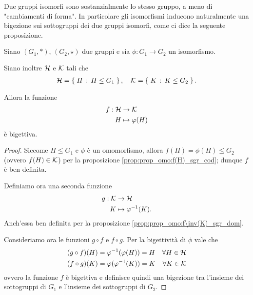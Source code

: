 Due gruppi isomorfi sono sostanzialmente lo stesso gruppo, a meno di "cambiamenti di forma". In particolare gli isomorfismi inducono naturalmente una bigezione sui sottogruppi dei due gruppi isomorfi, come ci dice la seguente proposizione.

\begin{proposition}
     \label{prop:big_sottogrp_isom}
    Siano $(G_1, *)$, $(G_2, \star)$ due gruppi e sia $\phi : G_1 \to G_2$ un isomorfismo.

    Siano inoltre $\mathcal{H}$ e $\mathcal{K}$ tali che \begin{align*}
        \mathcal{H} = \left\{\;H \,:\, H \leq G_1\;\right\}, \quad \mathcal{K} = \left\{\;K \,:\, K \leq G_2\;\right\}.
    \end{align*}

    Allora la funzione \begin{align*}
        f : \mathcal{H} &\to \mathcal{K} \\
        H &\mapsto \varphi(H)
    \end{align*} è bigettiva.
\end{proposition}
\begin{proof}
    Siccome $H \leq G_1$ e $\phi$ è un omomorfismo, allora $f(H) = \phi(H) \leq G_2$ (ovvero $f(H) \in \mathcal{K}$) per la proposizione \ref{prop:prop_omo:f(H)_sgr_cod}; dunque $f$ è ben definita.

    Definiamo ora una seconda funzione \begin{align*}
        g : \mathcal{K} &\to \mathcal{H}\\
        K &\mapsto \varphi^{-1}(K).
    \end{align*} Anch'essa ben definita per la proposizione \ref{prop:prop_omo:f\inv(K)_sgr_dom}.

    Consideriamo ora le funzioni $g \circ f$ e $f \circ g$. Per la bigettività di $\phi$ vale che \begin{align*}
        &(g \circ f)(H) = \varphi^{-1}(\varphi(H)) = H &\forall H \in \mathcal{H}\\
        &(f \circ g)(K) = \varphi(\varphi^{-1}(K)) = K &\forall K \in \mathcal{K}
    \end{align*} ovvero la funzione $f$ è bigettiva e definisce quindi una bigezione tra l'insieme dei sottogruppi di $G_1$ e l'insieme dei sottogruppi di $G_2$.
\end{proof}

